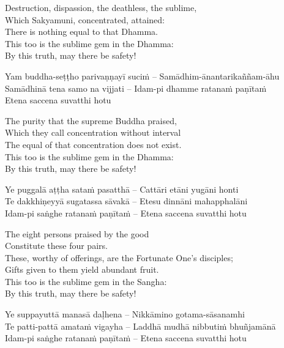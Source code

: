 \begin{english-verses}
  Destruction, dispassion, the deathless, the sublime,\\
  Which Sakyamuni, concentrated, attained:\\
  There is nothing equal to that Dhamma.\\
  This too is the sublime gem in the Dhamma:\\
  By this truth, may there be safety!
\end{english-verses}

Yam buddha-seṭṭho parivaṇṇayī suciṁ – Samādhim-ānantarikaññam-āhu\\
Samādhinā tena samo na vijjati – Idam-pi dhamme ratanaṁ paṇītaṁ\\
Etena saccena suvatthi hotu

\begin{english-verses}
  The purity that the supreme Buddha praised,\\
  Which they call concentration without interval\\
  The equal of that concentration does not exist.\\
  This too is the sublime gem in the Dhamma:\\
  By this truth, may there be safety!
\end{english-verses}

Ye puggalā aṭṭha sataṁ pasatthā – Cattāri etāni yugāni honti\\
Te dakkhiṇeyyā sugatassa sāvakā – Etesu dinnāni mahapphalāni\\
Idam-pi saṅghe ratanaṁ paṇītaṁ – Etena saccena suvatthi hotu

\begin{english-verses}
  The eight persons praised by the good\\
  Constitute these four pairs.\\
  These, worthy of offerings, are the Fortunate One's disciples;\\
  Gifts given to them yield abundant fruit.\\
  This too is the sublime gem in the Sangha:\\
  By this truth, may there be safety!
\end{english-verses}

Ye suppayuttā manasā daḷhena – Nikkāmino gotama-sāsanamhi\\
Te patti-pattā amataṁ vigayha – Laddhā mudhā nibbutiṁ bhuñjamānā\\
Idam-pi saṅghe ratanaṁ paṇītaṁ – Etena saccena suvatthi hotu

